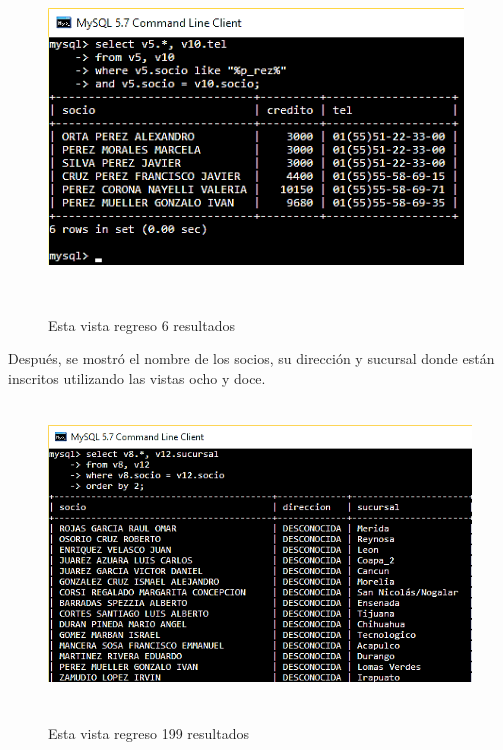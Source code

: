 \documentclass[12pt, titlepage]{article}
\begin{document}
		\begin{figure}[H]
		\begin{center}
			\includegraphics[width=11cm, height=8.5cm]{img/v15.png}
			\label{fig:15}
			\caption{Esta vista regreso 6 resultados}
		\end{center}
	\end{figure}
	 
	Después, se mostró el nombre de los socios, su dirección y sucursal donde están inscritos utilizando las vistas ocho y doce.
		\begin{figure}[H]
		\begin{center}
			\includegraphics[width=14cm, height=8cm]{img/v16.png}
			\label{fig:16}
			\caption{Esta vista regreso 199 resultados}
		\end{center}
	\end{figure}
	
\end{document}
